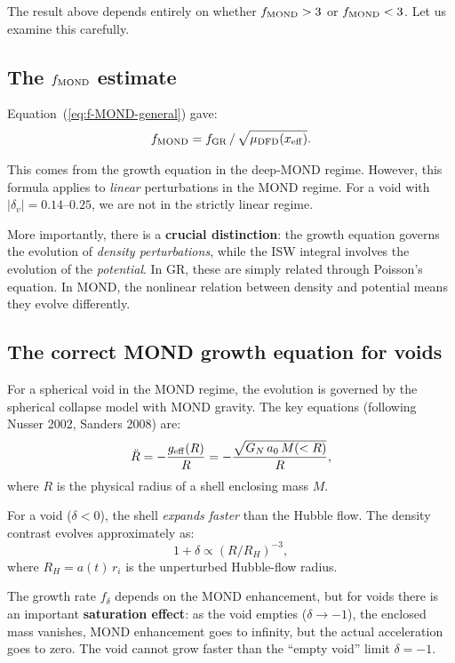\documentclass[11pt,a4paper]{article}
\newcommand{\aM}{a_0}
\newcommand{\mufd}{\mu_{\rm DFD}}
\begin{document}
The result above depends entirely on whether $f_{\rm MOND} > 3$ or
$f_{\rm MOND} < 3$. Let us examine this carefully.

\subsection{The $f_{\rm MOND}$ estimate}

Equation~(\ref{eq:f-MOND-general}) gave:
\begin{equation}
f_{\rm MOND} = f_{\rm GR}\,/\,\sqrt{\mufd(x_{\rm eff})}.
\end{equation}

This comes from the growth equation in the deep-MOND regime. However,
this formula applies to \emph{linear} perturbations in the MOND regime.
For a void with $|\delta_v| = 0.14$--$0.25$, we are not in the
strictly linear regime.

More importantly, there is a \textbf{crucial distinction}: the growth
equation governs the evolution of \emph{density perturbations},
while the ISW integral involves the evolution of the \emph{potential}.
In GR, these are simply related through Poisson's equation. In MOND,
the nonlinear relation between density and potential means they evolve
differently.

\subsection{The correct MOND growth equation for voids}

For a spherical void in the MOND regime, the evolution is governed by
the spherical collapse model with MOND gravity. The key equations
(following Nusser 2002, Sanders 2008) are:
\begin{equation}
\ddot{R} = -\frac{g_{\rm eff}(R)}{R}
= -\frac{\sqrt{G_N\,\aM\,M(<R)}}{R},
\label{eq:shell-MOND}
\end{equation}
where $R$ is the physical radius of a shell enclosing mass $M$.

For a void ($\delta < 0$), the shell \emph{expands faster} than the
Hubble flow. The density contrast evolves approximately as:
\begin{equation}
1 + \delta \propto (R/R_H)^{-3},
\end{equation}
where $R_H = a(t)\,r_i$ is the unperturbed Hubble-flow radius.

The growth rate $f_\delta$ depends on the MOND enhancement, but for
voids there is an important \textbf{saturation effect}: as the void
empties ($\delta \to -1$), the enclosed mass vanishes, MOND
enhancement goes to infinity, but the actual acceleration goes to
zero. The void cannot grow faster than the ``empty void'' limit
$\delta = -1$.
\end{document}
